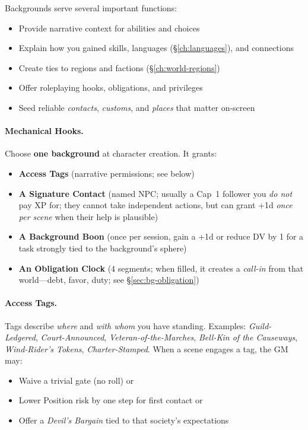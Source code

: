 Backgrounds serve several important functions:
\begin{itemize}
\item Provide narrative context for abilities and choices
\item Explain how you gained skills, languages (\S\ref{ch:languages}), and connections
\item Create ties to regions and factions (\S\ref{ch:world-regions})
\item Offer roleplaying hooks, obligations, and privileges
\item Seed reliable \emph{contacts}, \emph{customs}, and \emph{places} that matter on-screen
\end{itemize}

\paragraph{Mechanical Hooks.}
Choose \textbf{one background} at character creation. It grants:
\begin{itemize}
\item \textbf{Access Tags} (narrative permissions; see below)
\item \textbf{A Signature Contact} (named NPC; usually a Cap~1 follower you \emph{do not} pay XP for; they cannot take independent actions, but can grant +1d \emph{once per scene} when their help is plausible)
\item \textbf{A Background Boon} (once per session, gain a +1d or reduce DV by 1 for a task strongly tied to the background's sphere)
\item \textbf{An Obligation Clock} (4 segments; when filled, it creates a \emph{call-in} from that world—debt, favor, duty; see \S\ref{sec:bg-obligation})
\end{itemize}

\paragraph{Access Tags.}
Tags describe \emph{where} and \emph{with whom} you have standing. Examples: \textit{Guild-Ledgered}, \textit{Court-Announced}, \textit{Veteran-of-the-Marches}, \textit{Bell-Kin of the Causeways}, \textit{Wind-Rider's Tokens}, \textit{Charter-Stamped}. When a scene engages a tag, the GM may:
\begin{itemize}
\item Waive a trivial gate (no roll) or
\item Lower Position risk by one step for first contact or
\item Offer a \emph{Devil's Bargain} tied to that society's expectations
\end{itemize}

